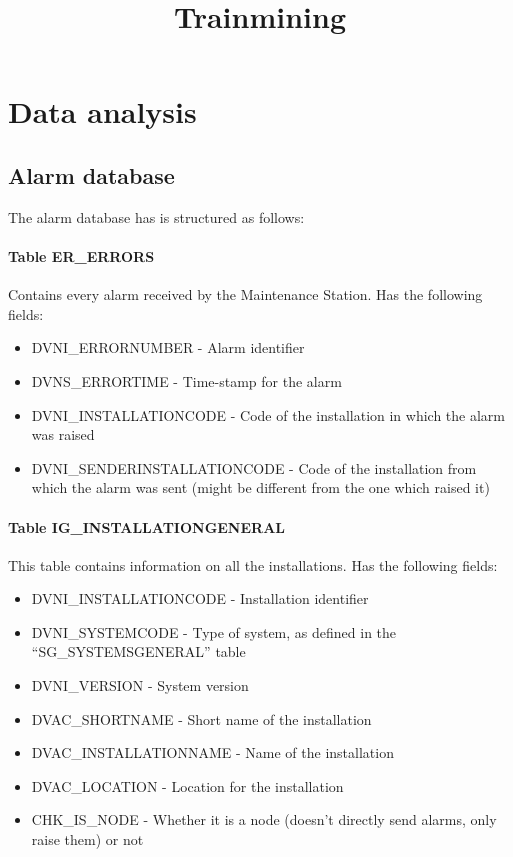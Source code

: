 \documentclass[a4paper,10pt]{report}
\title{Trainmining}
\author{}
\begin{document}
\newcommand\litem[1]{\item{\bfseries #1 }}
\renewcommand{\abstractname}{Executive Summary}
\begin{abstract}

\end{abstract}


\maketitle
\setcounter{chapter}{1}
\chapter{Data analysis}
\section{Alarm database}
The alarm database has is structured as follows:\cite{Feyyad1996}
\subsubsection*{Table ER\_ERRORS}
Contains every alarm received by the Maintenance Station. Has the following fields:
\begin{itemize}
 \item DVNI\_ERRORNUMBER - Alarm identifier
 \item DVNS\_ERRORTIME - Time-stamp for the alarm
 \item DVNI\_INSTALLATIONCODE - Code of the installation in which the alarm was raised
 \item DVNI\_SENDERINSTALLATIONCODE - Code of the installation from which the alarm was sent (might be different from the one which raised it)
\end{itemize}

\subsubsection*{Table IG\_INSTALLATIONGENERAL}
This table contains information on all the installations. Has the following fields:
\begin{itemize}
 \item DVNI\_INSTALLATIONCODE - Installation identifier
 \item DVNI\_SYSTEMCODE - Type of system, as defined in the ``SG\_SYSTEMSGENERAL'' table
 \item DVNI\_VERSION - System version
 \item DVAC\_SHORTNAME - Short name of the installation
 \item DVAC\_INSTALLATIONNAME - Name of the installation
 \item DVAC\_LOCATION - Location for the installation
 \item CHK\_IS\_NODE - Whether it is a node (doesn't directly send alarms, only raise them) or not
\end{itemize}
\end{document}
